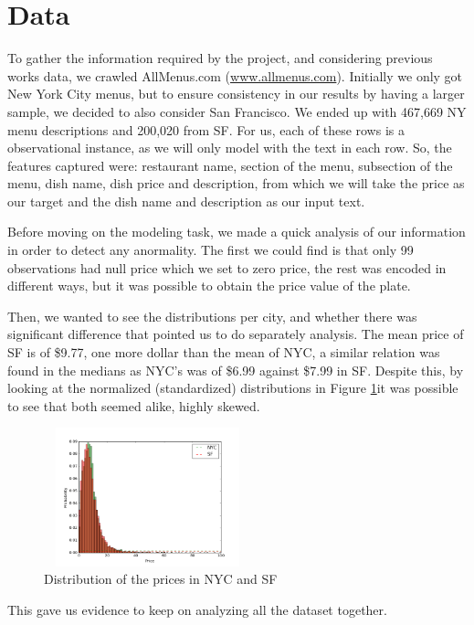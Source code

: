 \documentclass[11pt,letterpaper]{article}
\begin{document}
\section{Data}
To gather the information required by the project, and considering previous works data, we crawled AllMenus.com (\url{www.allmenus.com}). Initially we only got New York City menus, but to ensure consistency in our results by having a larger sample, we decided to also consider San Francisco. We ended up with 467,669 NY menu descriptions and 200,020 from SF. For us, each of these rows is a observational instance, as we will only model with the text in each row. So, the features captured were: restaurant name,  section of the menu, subsection of the menu, dish name, dish price and description, from which we will take the price as our target and the dish name and description as our input text.

Before moving on the modeling task, we made a quick analysis of our information in order to detect any anormality.  The first we could find is that only 99 observations had null price which we set to zero price, the rest was encoded in different ways, but it was possible to obtain the price value of the plate. 

Then, we wanted to see the distributions per city, and whether there was significant difference that pointed us to do separately analysis. The mean price of SF is of \$9.77, one more dollar than the mean of NYC, a similar relation was found in the medians as NYC's was of \$6.99 against \$7.99 in SF. Despite this, by looking at the normalized (standardized) distributions in Figure \ref{fig:price_dist}it was possible to see that both seemed alike, highly skewed. 

   \begin{figure}[thpb]
      \centering
      \includegraphics[width=6cm, height=4cm]{dist_sf_nyc_prices}
      \caption{Distribution of the prices in NYC and SF}
      \label{fig:price_dist}
   \end{figure}

This gave us evidence to keep on analyzing all the dataset together. 
\end{document}
